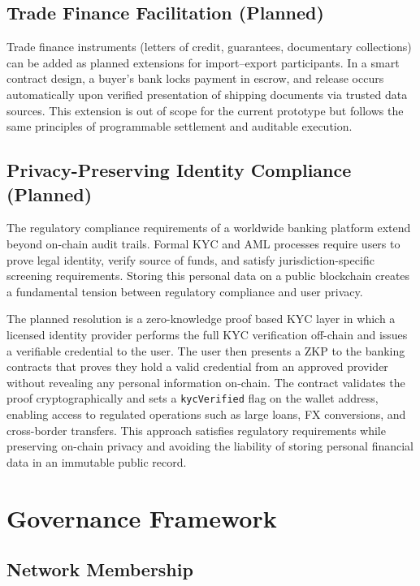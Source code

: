 \documentclass[12pt,a4paper]{report}
\begin{document}
\subsection{Trade Finance Facilitation (Planned)}

Trade finance instruments (letters of credit, guarantees, documentary collections) can be added as planned extensions for import--export participants. In a smart contract design, a buyer's bank locks payment in escrow, and release occurs automatically upon verified presentation of shipping documents via trusted data sources. This extension is out of scope for the current prototype but follows the same principles of programmable settlement and auditable execution.

\subsection{Privacy-Preserving Identity Compliance (Planned)}
\label{sec:zkp-compliance}

The regulatory compliance requirements of a worldwide banking platform extend beyond on-chain audit trails. Formal KYC and AML processes require users to prove legal identity, verify source of funds, and satisfy jurisdiction-specific screening requirements. Storing this personal data on a public blockchain creates a fundamental tension between regulatory compliance and user privacy.

The planned resolution is a zero-knowledge proof based KYC layer in which a licensed identity provider performs the full KYC verification off-chain and issues a verifiable credential to the user. The user then presents a ZKP to the banking contracts that proves they hold a valid credential from an approved provider without revealing any personal information on-chain. The contract validates the proof cryptographically and sets a \texttt{kycVerified} flag on the wallet address, enabling access to regulated operations such as large loans, FX conversions, and cross-border transfers. This approach satisfies regulatory requirements while preserving on-chain privacy and avoiding the liability of storing personal financial data in an immutable public record.


\section{Governance Framework}

\subsection{Network Membership}
\end{document}
